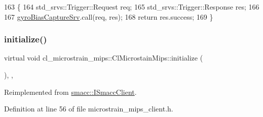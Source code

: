 \begin{DoxyCode}
163     \{
164         std\_srvs::Trigger::Request req;
165         std\_srvs::Trigger::Response res;
166 
167         \hyperlink{classcl__microstrain__mips_1_1ClMicrostainMips_a584ea1089a89cd1039494d0fce19485c}{gyroBiasCaptureSrv}.call(req, res);
168         \textcolor{keywordflow}{return} res.success;
169     \}
\end{DoxyCode}
\mbox{\label{classcl__microstrain__mips_1_1ClMicrostainMips_ab52b739d8230f932ad3042fcd1b697f4}} 
\subsubsection{\texorpdfstring{initialize()}{initialize()}}
{\footnotesize\ttfamily virtual void cl\+\_\+microstrain\+\_\+mips\+::\+Cl\+Microstain\+Mips\+::initialize (\begin{DoxyParamCaption}{ }\end{DoxyParamCaption})\hspace{0.3cm}{\ttfamily [inline]}, {\ttfamily [override]}, {\ttfamily [virtual]}}



Reimplemented from \hyperlink{classsmacc_1_1ISmaccClient_a974ebb6ad6cf812e7b9de6b78b3d901f}{smacc\+::\+I\+Smacc\+Client}.



Definition at line 56 of file microstrain\+\_\+mips\+\_\+client.\+h.



